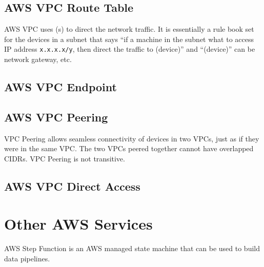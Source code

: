 \subsection{AWS VPC Route Table} \label{ap:aws_vpc_route_table}

AWS VPC uses (s) to direct the network traffic. It is essentially a rule book set for the devices in a subnet that says ``if a machine in the subnet what to access IP address \texttt{x.x.x.x/y}, then direct the traffic to (device)'' and ``(device)'' can be network gateway, etc.

\subsection{AWS VPC Endpoint}

\subsection{AWS VPC Peering}

VPC Peering allows seamless connectivity of devices in two VPCs, just as if they were in the same VPC. The two VPCs peered together cannot have overlapped CIDRs. VPC Peering is not transitive. 


\subsection{AWS VPC Direct Access}








\section{Other AWS Services}

AWS Step Function is an AWS managed state machine that can be used to build data pipelines.






